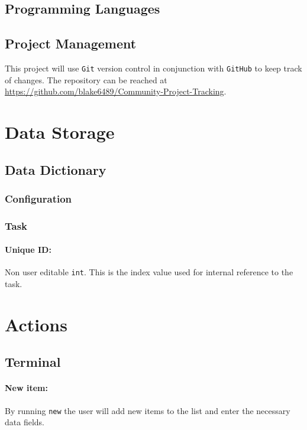 \documentclass[12pt]{article}
\newcommand{\e}[1] {{\tt #1}}
\begin{document}
\subsection{Programming Languages}


\subsection{Project Management}
This project will use \e{Git} version control in conjunction with \e{GitHub} to keep track of changes. The repository can be reached at \url{https://github.com/blake6489/Community-Project-Tracking}.

\section{Data Storage}\label{sec:Data Storage}
\subsection{Data Dictionary}\label{sec:Data Dictionary}
\subsubsection{Configuration} \label{sec:Configuration}



\subsubsection{Task} \label{sec:Task}
\paragraph{Unique ID:} Non user editable \e{int}. This is the index value used for internal reference to the task. 

\section{Actions} \label{sec:Actions}
\subsection{Terminal}
\setcounter{paragraph}{0}
\setcounter{subsubsection}{0}
\paragraph{New item:} \label{sec:New item} By running \e{new} the user will add new items to the list and enter the necessary data fields.
\end{document}
